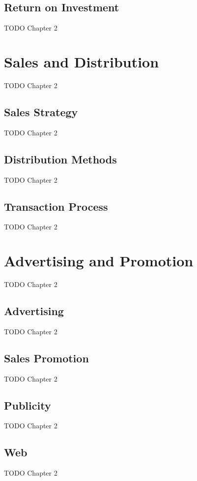 \subsection{Return on Investment}

TODO Chapter 2


\section{Sales and Distribution}

TODO Chapter 2

\subsection{Sales Strategy}

TODO Chapter 2

\subsection{Distribution Methods}

TODO Chapter 2

\subsection{Transaction Process}

TODO Chapter 2


\section{Advertising and Promotion}

TODO Chapter 2

\subsection{Advertising}

TODO Chapter 2

\subsection{Sales Promotion}

TODO Chapter 2

\subsection{Publicity}

TODO Chapter 2

\subsection{Web}

TODO Chapter 2
